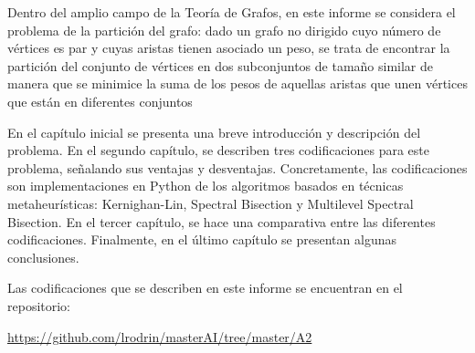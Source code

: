 Dentro del amplio campo de la Teoría de Grafos, en este informe se considera el problema de la partición del grafo: dado un grafo no dirigido cuyo número de vértices es par y cuyas aristas tienen asociado un peso, se trata de encontrar la partición del conjunto de vértices en dos subconjuntos de tamaño similar de manera que se minimice la suma de los pesos de aquellas aristas que unen vértices que están en diferentes conjuntos

En el capítulo inicial se presenta una breve introducción y descripción del problema. En el segundo capítulo, se describen tres codificaciones para este problema, señalando sus ventajas y desventajas. Concretamente, las codificaciones son implementaciones en Python de los algoritmos basados en técnicas metaheurísticas: Kernighan-Lin, Spectral Bisection y Multilevel Spectral Bisection. En el tercer capítulo, se hace una comparativa entre las diferentes codificaciones. Finalmente, en el último capítulo se presentan algunas conclusiones.

Las codificaciones que se describen en este informe se encuentran en el repositorio:

\begin{center}
	\url{https://github.com/lrodrin/masterAI/tree/master/A2}\label{GitHub}
\end{center}
